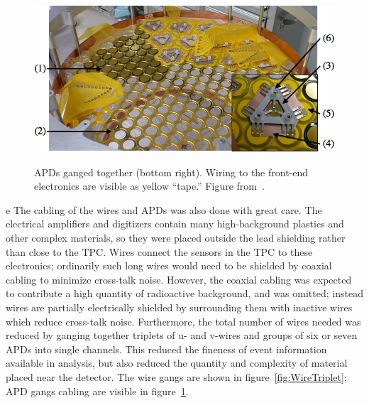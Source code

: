 \begin{figure}
\begin{center}
\includegraphics[keepaspectratio=true,width=\textwidth]{PlatterWGO7.png}
\end{center}
\renewcommand{\baselinestretch}{1}
\small\normalsize
\begin{quote}
\caption{APDs ganged together (bottom right).  Wiring to the front-end electronics are visible as yellow ``tape.''  Figure from~\cite{detectorPartI}.}
\label{fig:APDgang}
\end{quote}
\end{figure}
\renewcommand{\baselinestretch}{2}
\small\normalsize
e 
The cabling of the wires and APDs was also done with great care.  The electrical amplifiers and digitizers contain many high-background plastics and other complex materials, so they were placed outside the lead shielding rather than close to the TPC.  Wires connect the sensors in the TPC to these electronics; ordinarily such long wires would need to be shielded by coaxial cabling to minimize cross-talk noise.  However, the coaxial cabling was expected to contribute a high quantity of radioactive background, and was omitted; instead wires are partially electrically shielded by surrounding them with inactive wires which reduce cross-talk noise.  Furthermore, the total number of wires needed was reduced by ganging together triplets of u- and v-wires and groups of six or seven APDs into single channels. This reduced the fineness of event information available in analysis, but also reduced the quantity and complexity of material placed near the detector.  The wire gangs are shown in figure~\ref{fig:WireTriplet}; APD gangs cabling are visible in figure~\ref{fig:APDgang}.~\cite{detectorPartI}

